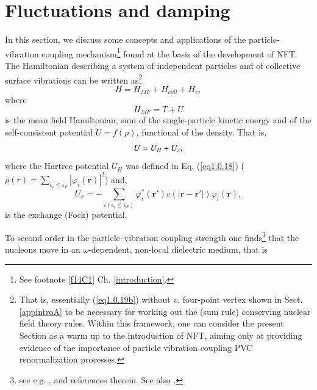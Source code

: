 \section{Fluctuations and damping}\label{appintroD}
In this section, we discuss some concepts and applications of the particle-vibration coupling mechanism\footnote{See footnote \ref{f14C1} Ch. \ref{introduction}.} found at the basis of the development of NFT.
The Hamiltonian describing a system of independent particles and of collective surface vibrations can be written as\footnote{That is, essentially (\ref{eq1.0.19b}) without $v$, four-point vertex shown in Sect. \ref{appintroA} to be necessary for working out the (sum rule) conserving nuclear field theory rules. Within this framework, one can consider the present Section as a warm up to the introduction of NFT, aiming only at providing evidence of the importance of particle vibration coupling PVC renormalization processes.} 
\begin{equation}\label{eqn:30}
H = H_{MF}  + H_{coll} + H_{c} ,
\end{equation}
where
\begin{equation}\label{eq1.3.2}
H_{MF}=T+U
\end{equation}
is the mean field Hamiltonian, sum of the single-particle kinetic energy and of the self-consistent potential $U=f(\rho)$, functional of the  density. That is,
\begin{equation}
U=U_H+U_x,\idx{Hartree-Fock field}
\end{equation}
where the Hartree potential $U_H$ was defined in Eq. (\ref{eq1.0.18}) ($\rho(r)=\sum_{\epsilon_i\leq\epsilon_F}|\varphi_i(\mathbf r)|^2$) and,
\begin{equation}\label{eq2.3.4}
U_x=-\sum_{i(\epsilon_i\leq\epsilon_F)}\varphi_i^*(\mathbf r')v(|\mathbf r- \mathbf r'|)\varphi_i(\mathbf r),
\end{equation}
is the exchange (Fock) potential. 



 To second order in the particle--vibration coupling strength one finds\footnote{see e.g. \cite{Brink:05}, \cite{Mahaux:85} and references therein. See also \cite{Bernard:81}.} that the nucleons move in an $\omega$-dependent, non-local dielectric medium, that is 

